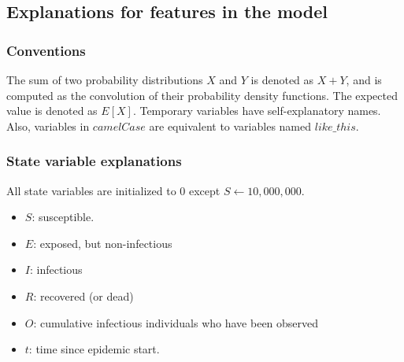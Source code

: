 \documentclass{article}
\begin{document}
\subsection{Explanations for features in the model}

\subsubsection{Conventions}
The sum of two probability distributions $X$ and $Y$ is denoted as $X+Y$, and is computed as the convolution of their probability density functions. The expected value is denoted as $E[X]$. Temporary variables have self-explanatory names. Also, variables in $camelCase$ are equivalent to variables named $like\_this$. 


\subsubsection{State variable explanations}
All state variables are initialized to 0 except $S \gets 10,000,000$. 

\begin{itemize}
    \item $S$: susceptible.
    \item $E$: exposed, but non-infectious
    \item $I$: infectious
    \item $R$: recovered (or dead)
    \item $O$: cumulative infectious individuals who have been observed 
    \item $t$: time since epidemic start.
\end{itemize}
\end{document}
